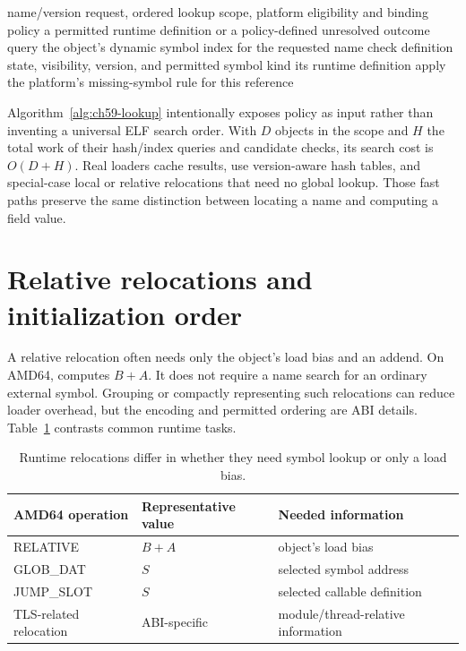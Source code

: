 \begin{algorithm}[htbp]
\caption{Resolve a runtime reference under an explicitly supplied lookup policy.}
\label{alg:ch59-lookup}
\begin{pseudocode}
\Require name/version request, ordered lookup scope, platform eligibility and binding policy
\Ensure a permitted runtime definition or a policy-defined unresolved outcome
  \State query the object's dynamic symbol index for the requested name
    \State check definition state, visibility, version, and permitted symbol kind
      \State \Return its runtime definition
    \EndIf
  \EndFor
\EndFor
\State apply the platform's missing-symbol rule for this reference
\end{pseudocode}
\end{algorithm}

Algorithm~\ref{alg:ch59-lookup} intentionally exposes policy as input rather than inventing a universal ELF search order.
With $D$ objects in the scope and $H$ the total work of their hash/index queries and candidate checks, its search cost is $O(D+H)$.
Real loaders cache results, use version-aware hash tables, and special-case local or relative relocations that need no global lookup.
Those fast paths preserve the same distinction between locating a name and computing a field value.

\section{Relative relocations and initialization order}
\label{sec:ch59-relocation}

A relative relocation often needs only the object's load bias and an addend.
On AMD64,  computes $B+A$.
It does not require a name search for an ordinary external symbol.
Grouping or compactly representing such relocations can reduce loader overhead, but the encoding and permitted ordering are ABI details.
Table~\ref{tab:ch59-runtime-reloc} contrasts common runtime tasks.

\begin{table}[htbp]
\caption{Runtime relocations differ in whether they need symbol lookup or only a load bias.}
\label{tab:ch59-runtime-reloc}
\centering
\begin{tabular}{lll}
\toprule
AMD64 operation & Representative value & Needed information \\
\midrule
RELATIVE & $B+A$ & object's load bias \\
GLOB\_DAT & $S$ & selected symbol address \\
JUMP\_SLOT & $S$ & selected callable definition \\
TLS-related relocation & ABI-specific & module/thread-relative information \\
\bottomrule
\end{tabular}
\end{table}


